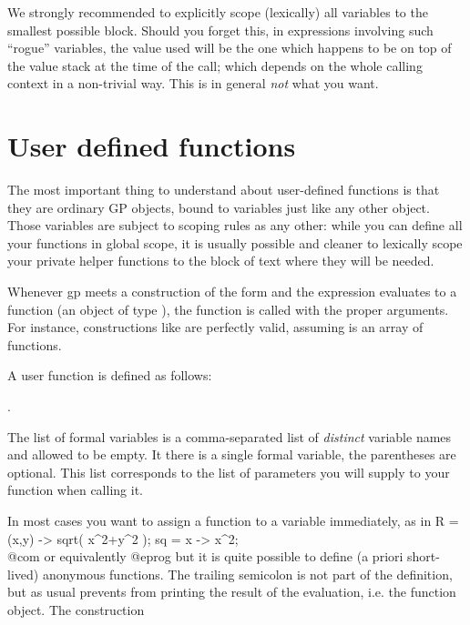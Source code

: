 We strongly recommended to explicitly scope (lexically) all variables to the
smallest possible block. Should you forget this, in expressions involving such
``rogue'' variables, the value used will be the one which happens to be on
top of the value stack at the time of the call; which depends on the whole
calling context in a non-trivial way. This is in general \emph{not} what you
want.

\section{User defined functions}
\label{se:user_defined}

The most important thing to understand about user-defined functions is
that they are ordinary GP objects, bound to variables just like any
other object. Those variables are subject to scoping rules as any other:
while you can define all your functions in global scope, it is usually
possible and cleaner to lexically scope your private helper functions to the
block of text where they will be needed.

Whenever gp meets a construction of the form 
and the expression  evaluates to a function (an object of type
), the function is called with the proper arguments. For
instance, constructions like  are perfectly valid,
assuming  is an array of functions.

\label{se:userfundef}

A user function is defined as follows:

  .

\noindent The list of formal variables is a comma-separated list of
\emph{distinct} variable names and allowed to be empty. It there is a single
formal variable, the parentheses are optional. This list corresponds to the
list of parameters you will supply to your function when calling it.

In most cases you want to assign a function to a variable immediately, as in
\bprog
R = (x,y) -> sqrt( x^2+y^2 );
sq = x -> x^2;  \\@com or equivalently 
@eprog\noindent
but it is quite possible to define (a priori short-lived) anonymous functions.
The trailing semicolon is not part of the definition, but as usual prevents
 from printing the result of the evaluation, i.e. the function
object. The construction

